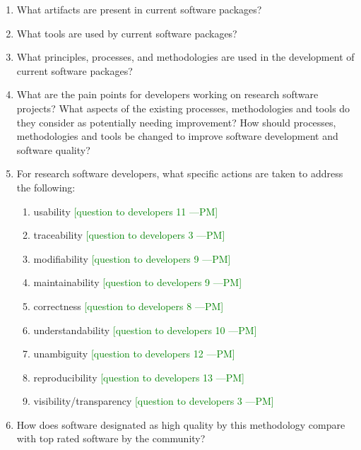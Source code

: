 \documentclass[letterpaper,cleveref]{lipics-v2019}
\newcommand{\authornote}[3]{\textcolor{#1}{[#3 ---#2]}}
\newcommand{\authornote}[3]{}
\newcommand{\pmi}[1]{\authornote{green}{PM}{#1}} %
\theoremstyle{definition}
\begin{document}
\begin{enumerate}
\item What artifacts are present in current software packages? 
\item What tools are used by current software packages?
\item What principles, processes, and methodologies are used in the development
  of current software packages?
\item What are the pain points for developers working on research software
  projects?  What aspects of the existing processes, methodologies and tools do
  they consider as potentially needing improvement?  How should processes,
  methodologies and tools be changed to improve software development and
  software quality?
\item For research software developers, what specific actions are taken to
  address the following:
\begin{enumerate}
\item usability \pmi{question to developers 11}
\item traceability \pmi{question to developers 3}
\item modifiability \pmi{question to developers 9}
\item maintainability \pmi{question to developers 9}
\item correctness \pmi{question to developers 8}
\item understandability \pmi{question to developers 10}
\item unambiguity \pmi{question to developers 12}
\item reproducibility \pmi{question to developers 13}
\item visibility/transparency \pmi{question to developers 3}
\end{enumerate} 
\item How does software designated as high quality by this methodology compare
  with top rated software by the community?
\end{enumerate}
\end{document}

